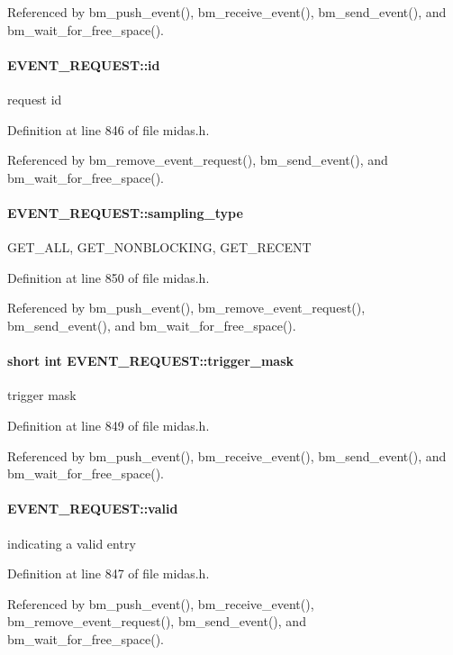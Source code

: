 Referenced by bm\_\-push\_\-event(), bm\_\-receive\_\-event(), bm\_\-send\_\-event(), and bm\_\-wait\_\-for\_\-free\_\-space().
\paragraph[{id}]{ {\bf EVENT\_\-REQUEST::id}}\hfill\label{structEVENT__REQUEST_ab5275898e99714ff529f7fe125a91d0e}
request id 

Definition at line 846 of file midas.h.

Referenced by bm\_\-remove\_\-event\_\-request(), bm\_\-send\_\-event(), and bm\_\-wait\_\-for\_\-free\_\-space().
\paragraph[{sampling\_\-type}]{ {\bf EVENT\_\-REQUEST::sampling\_\-type}}\hfill\label{structEVENT__REQUEST_a98d63806bfe8b8d66fad6d3d6d9b08e4}
GET\_\-ALL, GET\_\-NONBLOCKING, GET\_\-RECENT 

Definition at line 850 of file midas.h.

Referenced by bm\_\-push\_\-event(), bm\_\-remove\_\-event\_\-request(), bm\_\-send\_\-event(), and bm\_\-wait\_\-for\_\-free\_\-space().
\paragraph[{trigger\_\-mask}]{\setlength{\rightskip}{0pt plus 5cm}short int {\bf EVENT\_\-REQUEST::trigger\_\-mask}}\hfill\label{structEVENT__REQUEST_a8947eb12d18f6202ecc9d603f3bde410}
trigger mask 

Definition at line 849 of file midas.h.

Referenced by bm\_\-push\_\-event(), bm\_\-receive\_\-event(), bm\_\-send\_\-event(), and bm\_\-wait\_\-for\_\-free\_\-space().
\paragraph[{valid}]{ {\bf EVENT\_\-REQUEST::valid}}\hfill\label{structEVENT__REQUEST_aeac92027d8c58b1af391b5d76655f9bf}
indicating a valid entry 

Definition at line 847 of file midas.h.

Referenced by bm\_\-push\_\-event(), bm\_\-receive\_\-event(), bm\_\-remove\_\-event\_\-request(), bm\_\-send\_\-event(), and bm\_\-wait\_\-for\_\-free\_\-space().